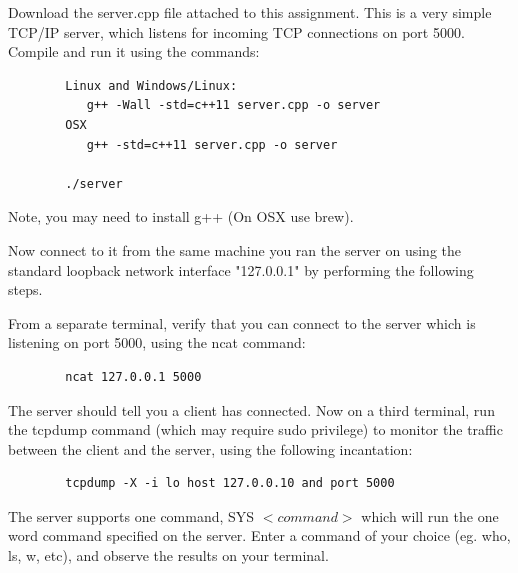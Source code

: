 \documentclass[9pt, addpoints]{exam}
\begin{document}
\begin{questions}
    \question
     Download the server.cpp file attached to this assignment.
     This is a very simple TCP/IP server, which listens for incoming
     TCP connections on port 5000.  Compile and run it using the commands:
     \begin{lstlisting}
        Linux and Windows/Linux:
           g++ -Wall -std=c++11 server.cpp -o server
        OSX
           g++ -std=c++11 server.cpp -o server

        ./server
     \end{lstlisting}

     Note, you may need to install g++ (On OSX use brew).

     Now connect to it from the same machine you ran the server on
     using the standard loopback network interface "127.0.0.1"
     by performing the following steps.

     From a separate terminal, verify that you can connect to the server 
     which is listening on port 5000, using the ncat command: 

     \begin{lstlisting}
        ncat 127.0.0.1 5000  
     \end{lstlisting}
     
     The server should tell you a client has connected.
     Now on a third terminal, run the tcpdump command (which may require sudo privilege) 
     to monitor the traffic between the client and the server, using the following incantation:

     \begin{lstlisting}
        tcpdump -X -i lo host 127.0.0.10 and port 5000
     \end{lstlisting}

     The server supports one command, SYS $<command>$ which will run the one word command
     specified on the server. Enter a command of your choice (eg. who, ls, w, etc), and 
     observe the results on your terminal. 

\end{questions}
\end{document}
